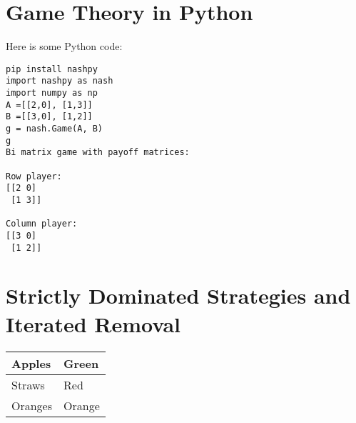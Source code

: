 \documentclass[a4paper,12pt]{article}
\begin{document}
\section{Game Theory in Python}
Here is some Python code:
\lstset{language=Python}
\lstset{frame=lines}
\lstset{basicstyle=\footnotesize}
\begin{lstlisting}
pip install nashpy
import nashpy as nash
import numpy as np
A =[[2,0], [1,3]]
B =[[3,0], [1,2]]
g = nash.Game(A, B)
g
Bi matrix game with payoff matrices:

Row player:
[[2 0]
 [1 3]]
 
Column player:
[[3 0]
 [1 2]]
\end{lstlisting}
\section{Strictly Dominated Strategies and Iterated Removal}
\begin{tabular}{|l|l|}

\hline
Apples & Green \\
\hline
Straws & Red \\
\hline
Oranges & Orange \\
\hline
\end{tabular}
\bigbreak
\end{document}
